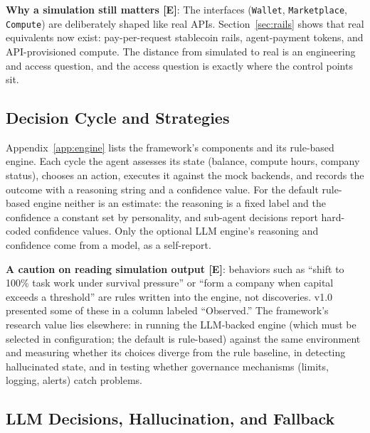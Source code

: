 \documentclass[11pt,letterpaper]{article}
\begin{document}
\textbf{Why a simulation still matters [E]}: The interfaces (\texttt{Wallet}, \texttt{Marketplace}, \texttt{Compute}) are deliberately shaped like real APIs. Section~\ref{sec:rails} shows that real equivalents now exist: pay-per-request stablecoin rails, agent-payment tokens, and API-provisioned compute. The distance from simulated to real is an engineering and access question, and the access question is exactly where the control points sit.

\subsection{Decision Cycle and Strategies}

Appendix~\ref{app:engine} lists the framework's components and its rule-based engine. Each cycle the agent assesses its state (balance, compute hours, company status), chooses an action, executes it against the mock backends, and records the outcome with a reasoning string and a confidence value. For the default rule-based engine neither is an estimate: the reasoning is a fixed label and the confidence a constant set by personality, and sub-agent decisions report hard-coded confidence values. Only the optional LLM engine's reasoning and confidence come from a model, as a self-report.

\textbf{A caution on reading simulation output [E]}: behaviors such as ``shift to 100\% task work under survival pressure'' or ``form a company when capital exceeds a threshold'' are rules written into the engine, not discoveries. v1.0 presented some of these in a column labeled ``Observed.'' The framework's research value lies elsewhere: in running the LLM-backed engine (which must be selected in configuration; the default is rule-based) against the same environment and measuring whether its choices diverge from the rule baseline, in detecting hallucinated state, and in testing whether governance mechanisms (limits, logging, alerts) catch problems.

\subsection{LLM Decisions, Hallucination, and Fallback}
\end{document}
